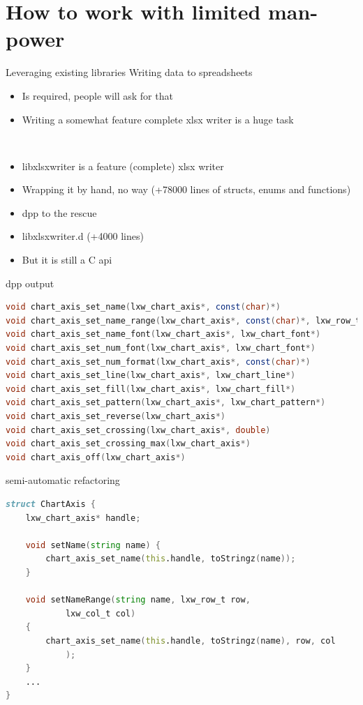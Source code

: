\documentclass[aspectratio=169,notes]{beamer}
\begin{document}
	\section{How to work with limited man-power}

	\begin{frame}{Leveraging existing libraries}
		Writing data to spreadsheets
		\begin{itemize}
			\item Is required, people will ask for that
			\item Writing a somewhat feature complete xlsx writer is a huge task
		\end{itemize}
		\mbox{}\\[1cm]
		\begin{itemize}
			\item libxlsxwriter is a feature (complete) xlsx writer
			\item Wrapping it by hand, no way (+78000 lines of structs, enums and functions)
			\item dpp to the rescue
			\item libxlsxwriter.d (+4000 lines)
			\item But it is still a C api
		\end{itemize}
	\end{frame}

	\begin{frame}[fragile]{dpp output}
		\begin{lstlisting}[language=D]
void chart_axis_set_name(lxw_chart_axis*, const(char)*)
void chart_axis_set_name_range(lxw_chart_axis*, const(char)*, lxw_row_t, lxw_col_t)
void chart_axis_set_name_font(lxw_chart_axis*, lxw_chart_font*)
void chart_axis_set_num_font(lxw_chart_axis*, lxw_chart_font*)
void chart_axis_set_num_format(lxw_chart_axis*, const(char)*)
void chart_axis_set_line(lxw_chart_axis*, lxw_chart_line*)
void chart_axis_set_fill(lxw_chart_axis*, lxw_chart_fill*)
void chart_axis_set_pattern(lxw_chart_axis*, lxw_chart_pattern*)
void chart_axis_set_reverse(lxw_chart_axis*)
void chart_axis_set_crossing(lxw_chart_axis*, double)
void chart_axis_set_crossing_max(lxw_chart_axis*)
void chart_axis_off(lxw_chart_axis*)
		\end{lstlisting}
	\end{frame}

	\begin{frame}[fragile]{semi-automatic refactoring}
		\begin{lstlisting}[language=D]
struct ChartAxis {
	lxw_chart_axis* handle;

	void setName(string name) { 
		chart_axis_set_name(this.handle, toStringz(name)); 
	}

	void setNameRange(string name, lxw_row_t row, 
			lxw_col_t col) 
	{
		chart_axis_set_name(this.handle, toStringz(name), row, col
			);
	}
	...
}
		\end{lstlisting}
	\end{frame}
\end{document}
